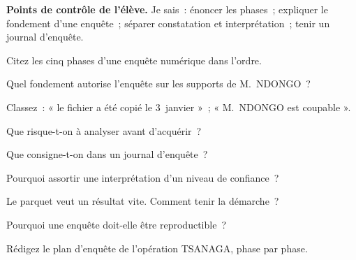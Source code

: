 \begin{boxinfo}
\textbf{Points de contrôle de l'élève.} Je sais~: énoncer les phases~;
expliquer le fondement d'une enquête~; séparer constatation et
interprétation~; tenir un journal d'enquête.
\end{boxinfo}

\bigskip

\begin{boxexo}[title={\ding{45}\quad Exercice~2.1. Les phases \niveaubase}]
Citez les cinq phases d'une enquête numérique dans l'ordre.
\end{boxexo}

\begin{boxexo}[title={\ding{45}\quad Exercice~2.2. Le titre \niveaubase}]
Quel fondement autorise l'enquête sur les supports de M.~NDONGO~?
\end{boxexo}

\begin{boxexo}[title={\ding{45}\quad Exercice~2.3. Constat ou interprétation \niveaubase}]
Classez~: « le fichier a été copié le 3~janvier »~; « M.~NDONGO est
coupable ».
\end{boxexo}

\begin{boxexo}[title={\ding{45}\quad Exercice~2.4. Sauter une phase \niveaumoyen}]
Que risque-t-on à analyser avant d'acquérir~?
\end{boxexo}

\begin{boxexo}[title={\ding{45}\quad Exercice~2.5. Journal \niveaumoyen}]
Que consigne-t-on dans un journal d'enquête~?
\end{boxexo}

\begin{boxexo}[title={\ding{45}\quad Exercice~2.6. Confiance \niveaumoyen}]
Pourquoi assortir une interprétation d'un niveau de confiance~?
\end{boxexo}

\begin{boxexo}[title={\ding{45}\quad Exercice~2.7. Pression \niveaumoyen}]
Le parquet veut un résultat vite. Comment tenir la démarche~?
\end{boxexo}

\begin{boxexo}[title={\ding{45}\quad Exercice~2.8. Reproductible \niveaumoyen}]
Pourquoi une enquête doit-elle être reproductible~?
\end{boxexo}

\begin{boxexo}[title={\ding{45}\quad Exercice~2.9. Plan d'enquête \niveauexpert}]
Rédigez le plan d'enquête de l'opération TSANAGA, phase par phase.
\end{boxexo}

